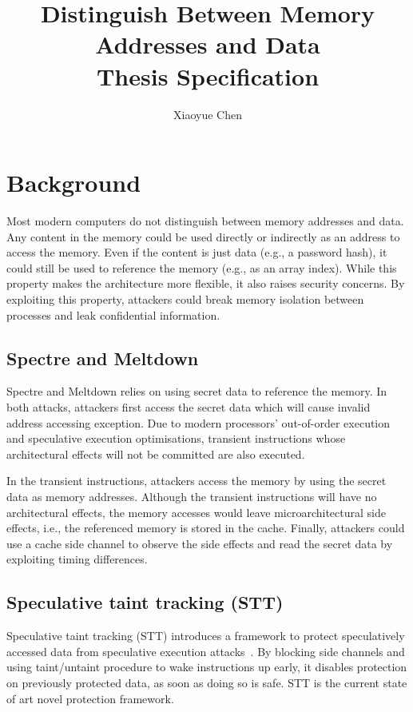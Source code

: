 \documentclass[a4paper]{article}
\title{Distinguish Between Memory Addresses and Data\\Thesis Specification}
\author{Xiaoyue Chen}
\begin{document}
\maketitle

\section{Background}
Most modern computers do not distinguish between memory addresses and
data. Any content in the memory could be used directly or indirectly
as an address to access the memory. Even if the content is just data
(e.g., a password hash), it could still be used to reference the
memory (e.g., as an array index). While this property makes the
architecture more flexible, it also raises security concerns. By
exploiting this property, attackers could break memory isolation
between processes and leak confidential information.

\subsection{Spectre and Meltdown}
Spectre \cite{kocher2019spectre} and Meltdown \cite{lipp2018meltdown}
relies on using secret data to reference the memory. In both attacks,
attackers first access the secret data which will cause invalid
address accessing exception. Due to modern processors' out-of-order
execution and speculative execution optimisations, transient
instructions whose architectural effects will not be committed are
also executed.

In the transient instructions, attackers access the memory by using
the secret data as memory addresses. Although the transient
instructions will have no architectural effects, the memory accesses
would leave microarchitectural side effects, i.e., the referenced
memory is stored in the cache. Finally, attackers could use a cache
side channel to observe the side effects and read the secret data by
exploiting timing differences.

\subsection{Speculative taint tracking (STT)}
Speculative taint tracking (STT) introduces a framework to protect
speculatively accessed data from speculative execution
attacks~\cite{yu2019speculative}. By blocking side channels and using
taint/untaint procedure to wake instructions up early, it disables
protection on previously protected data, as soon as doing so is safe.
STT is the current state of art novel protection framework.
\end{document}
